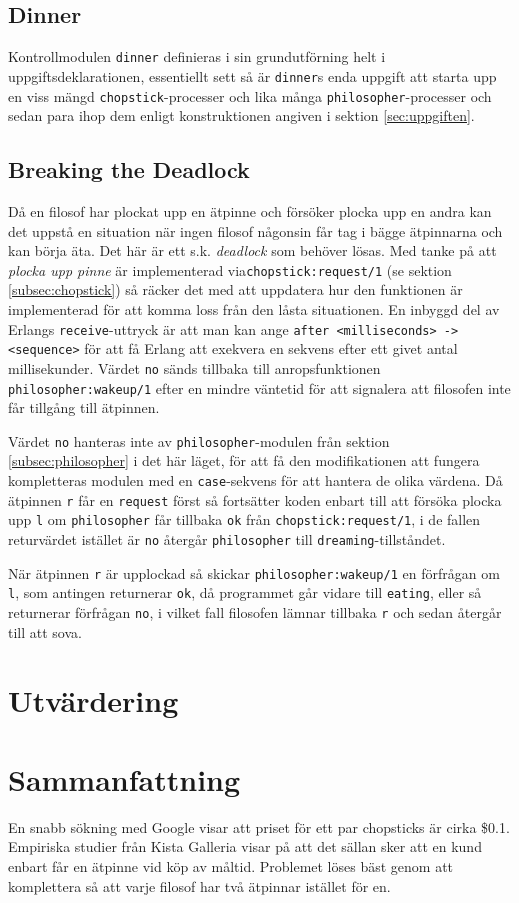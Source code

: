 \documentclass[a4paper, 11pt]{article}
\begin{document}
\subsection{Dinner}
Kontrollmodulen \texttt{dinner} definieras i sin grundutförning helt i uppgiftsdeklarationen, essentiellt sett så är \texttt{dinner}s enda uppgift att starta upp en viss mängd \texttt{chopstick}-processer och lika många \texttt{philosopher}-processer och sedan para ihop dem enligt konstruktionen angiven i sektion \ref{sec:uppgiften}.

\subsection{Breaking the Deadlock}
Då en filosof har plockat upp en ätpinne och försöker plocka upp en andra kan det uppstå en situation när ingen filosof någonsin får tag i bägge ätpinnarna och kan börja äta. Det här är ett s.k. \textit{deadlock} som behöver lösas. Med tanke på att \textit{plocka upp pinne} är implementerad via\texttt{chopstick:request/1} (se sektion \ref{subsec:chopstick}) så räcker det med att uppdatera hur den funktionen är implementerad för att komma loss från den låsta situationen. En inbyggd del av Erlangs \texttt{receive}-uttryck är att man kan ange \lstinline$after <milliseconds> -> <sequence>$ för att få Erlang att exekvera en sekvens efter ett givet antal millisekunder. Värdet \texttt{no} sänds tillbaka till anropsfunktionen \texttt{philosopher:wakeup/1} efter en mindre väntetid för att signalera att filosofen inte får tillgång till ätpinnen.

Värdet \texttt{no} hanteras inte av \texttt{philosopher}-modulen från sektion \ref{subsec:philosopher} i det här läget, för att få den modifikationen att fungera kompletteras modulen med en \texttt{case}-sekvens för att hantera de olika värdena. Då ätpinnen \texttt{r} får en \texttt{request} först så fortsätter koden enbart till att försöka plocka upp \texttt{l} om \texttt{philosopher} får tillbaka \texttt{ok} från \texttt{chopstick:request/1}, i de fallen returvärdet istället är \texttt{no} återgår \texttt{philosopher} till \texttt{dreaming}-tillståndet.

När ätpinnen \texttt{r} är upplockad så skickar \texttt{philosopher:wakeup/1} en förfrågan om \texttt{l}, som antingen returnerar \texttt{ok}, då programmet går vidare till \texttt{eating}, eller så returnerar förfrågan \texttt{no}, i vilket fall filosofen lämnar tillbaka \texttt{r} och sedan återgår till att sova.

\section{Utvärdering}

\section{Sammanfattning}
En snabb sökning med Google visar att priset för ett par chopsticks är cirka \$0.1. Empiriska studier från Kista Galleria visar på att det sällan sker att en kund enbart får en ätpinne vid köp av måltid. Problemet löses bäst genom att komplettera så att varje filosof har två ätpinnar istället för en. 
\end{document}
